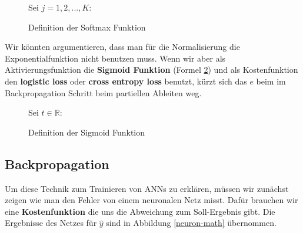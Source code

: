             \begin{figure}[H]
                \begin{mdframed}
                    Sei $j = 1,2,...,K$: \\
                    \hspace*{45mm} 
                \end{mdframed}
\formforfigure
                \caption{\label{softmax} Definition der Softmax Funktion \cite{softmax-lit}}
            \end{figure}

            \noindent
            Wir könnten argumentieren, dass man für die Normalisierung die Exponentialfunktion nicht benutzen muss. Wenn wir aber als Aktivierungsfunktion die \textbf{Sigmoid Funktion} (Formel \ref{sigmoid}) und als Kostenfunktion den \textbf{logistic loss} oder \textbf{cross entropy loss} benutzt, kürzt sich das $e$ beim im Backpropagation Schritt beim partiellen Ableiten weg.

            \begin{figure}[H]
                \begin{mdframed}
                    Sei $t \in \mathbb{R}$:\\
                    \hspace*{50mm} 
                \end{mdframed}
\formforfigure
                \caption{\label{sigmoid} Definition der Sigmoid Funktion}
            \end{figure}


            \subsection{Backpropagation} \label{backprop-chapter}
                Um diese Technik zum Trainieren von ANNs zu erklären, müssen wir zunächst zeigen wie man den Fehler von einem neuronalen Netz misst. Dafür brauchen wir eine \textbf{Kostenfunktion} die uns die Abweichung zum Soll-Ergebnis gibt. Die Ergebnisse des Netzes für $\widehat{y}$ sind in Abbildung \ref{neuron-math} übernommen.


